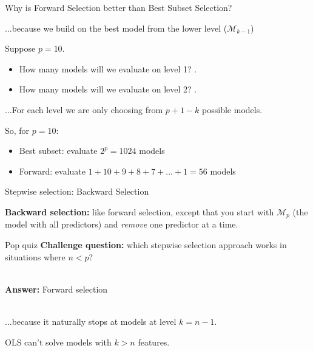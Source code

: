 \documentclass[mathserif, aspectratio=169]{beamer}
\begin{document}
\begin{frame}{Why is Forward Selection better than Best Subset Selection?}

\pause

...because we build on the best model from the lower level ($\mathcal{M}_{k-1}$)

\vspace{5mm}

Suppose $p=10$.  
\begin{itemize}
	\item How many models will we evaluate on level 1? . \pause
	\item How many models will we evaluate on level 2? .
\end{itemize}

\vspace{5mm}

...For each level we are only choosing from $p+1-k$ possible models.  

\vspace{5mm}


So, for $p = 10$: 
\pause
\begin{itemize}
\item Best subset: evaluate $2^p = 1024$ models
\item Forward: evaluate $1 + 10 + 9 + 8 + 7 + ... + 1 = 56$ models
\end{itemize}



\end{frame}

\begin{frame}{Stepwise selection: Backward  Selection}

\pause
\textbf{Backward selection:} like forward selection, except that you start with $\mathcal{M}_p$ (the model with all predictors) and \textit{remove} one predictor at a time.

\end{frame}


\begin{frame}{Pop quiz}
\textbf{Challenge question:} which stepwise selection approach works in situations where $n<p$?\\~\\

\pause

\textbf{Answer:} Forward selection\\~\\

\pause

...because it naturally stops at models at level $k=n-1$.  

\vspace{5mm}

OLS can't solve models with $k>n$ features.

\end{frame}
\end{document}

